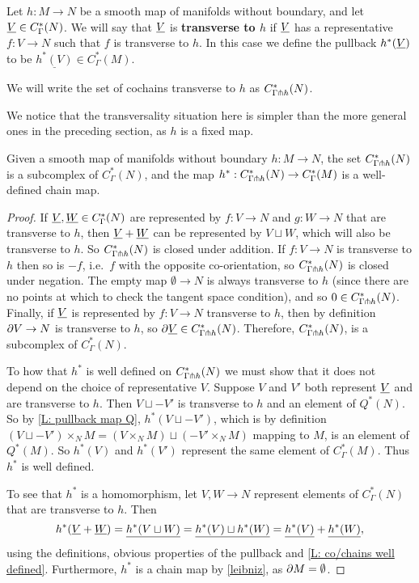 \begin{definition}\label{D: transverse to map}
	Let $h \colon M \to N$ be a smooth map of manifolds without boundary, and let $\underline{V} \in C^*_\Gamma(N)$.
	We will say that $\underline{V}$ is \textbf{transverse to $h$} if $\underline{V}$ has a representative $f \colon V \to N$ such that $f$ is transverse to $h$.
	In this case we define the pullback $h^*(\underline{V})$ to be $\underline{h^*(V)} \in C^*_\Gamma(M)$.

	We will write the set of cochains transverse to $h$ as $C^*_{\Gamma \pitchfork h}(N)$.
\end{definition}

We notice that the transversality situation here is simpler than the more general ones in the preceding section, as $h$ is a fixed map.

\begin{proposition}
	Given a smooth map of manifolds without boundary $h \colon M \to N$, the set $C^*_{\Gamma \pitchfork h}(N)$ is a subcomplex of $C^*_{\Gamma}(N)$, and the map $h^*:C^*_{\Gamma \pitchfork h}(N) \to C^*_{\Gamma}(M)$ is a well-defined chain map.
\end{proposition}

\begin{proof}
	If $\underline{V},\underline{W} \in C^*_\Gamma(N)$ are represented by $f \colon V \to N$ and $g \colon W \to N$ that are transverse to $h$, then $\underline{V}+\underline{W}$ can be represented by $V \sqcup W$, which will also be transverse to $h$.
	So $C^*_{\Gamma \pitchfork h}(N)$ is closed under addition.
	If $f \colon V \to N$ is transverse to $h$ then so is $-f$, i.e.\ $f$ with the opposite co-orientation, so $C^*_{\Gamma \pitchfork h}(N)$ is closed under negation.
	The empty map $\emptyset \to N$ is always transverse to $h$ (since there are no points at which to check the tangent space condition), and so $0 \in C^*_{\Gamma \pitchfork h}(N)$.
	Finally, if $\underline{V}$ is represented by $f \colon V \to N$ transverse to $h$, then by definition $\partial V \to N$ is transverse to $h$, so $\partial \underline{V} \in C^*_{\Gamma \pitchfork h}(N)$.
	Therefore, $C^*_{\Gamma \pitchfork h}(N)$, is a subcomplex of $C^*_{\Gamma}(N)$.

	To how that $h^*$ is well defined on $C^*_{\Gamma \pitchfork h}(N)$ we must show that it does not depend on the choice of representative $V$.
	Suppose $V$ and $V'$ both represent $\underline{V}$ and are transverse to $h$.
	Then $V \sqcup -V'$ is transverse to $h$ and an element of $Q^*(N)$.
	So by \cref{L: pullback map Q}, $h^*(V \sqcup -V')$, which is by definition $(V \sqcup -V') \times_N M = (V \times_N M) \sqcup (-V' \times_N M)$ mapping to $M$, is an element of $Q^*(M)$.
	So $h^*(V)$ and $h^*(V')$ represent the same element of $C^*_{\Gamma}(M)$.
	Thus $h^*$ is well defined.

	To see that $h^*$ is a homomorphism, let $V,W \to N$ represent elements of $C^*_{\Gamma}(N)$ that are transverse to $h$.
	Then
	$$h^*(\underline{V}+\underline{W}) = \underline{h^*(V \sqcup W)} = \underline{h^*(V) \sqcup h^*(W)} = \underline{h^*(V)}+\underline{h^*(W)},$$
	using the definitions, obvious properties of the pullback and \cref{L: co/chains well defined}.
	Furthermore, $h^*$ is a chain map by \cref{leibniz}, as $\partial M = \emptyset$.
\end{proof}

